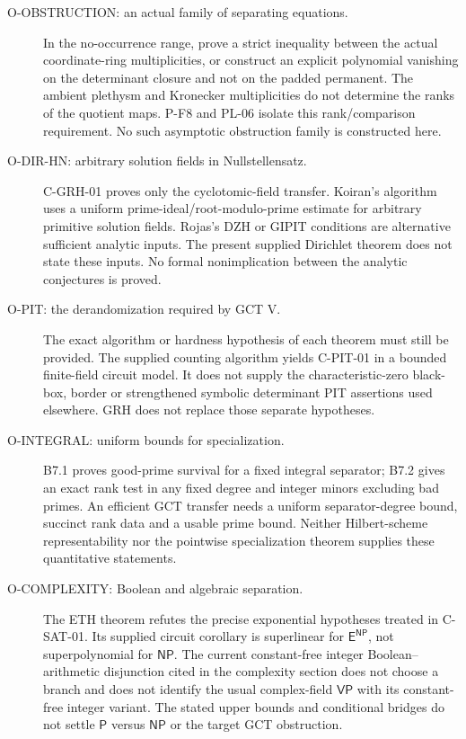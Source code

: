 \begin{description}
\item[O-OBSTRUCTION: an actual family of separating equations.]
In the no-occurrence range, prove a strict inequality between the actual
coordinate-ring multiplicities, or construct an explicit polynomial
vanishing on the determinant closure and not on the padded permanent.
The ambient plethysm and Kronecker multiplicities do not determine the
ranks of the quotient maps. P-F8 and PL-06 isolate this rank/comparison
requirement. No such asymptotic obstruction family is constructed here.

\item[O-DIR-HN: arbitrary solution fields in Nullstellensatz.]
C-GRH-01 proves only the cyclotomic-field transfer. Koiran's algorithm uses
a uniform prime-ideal/root-modulo-prime estimate for arbitrary primitive
solution fields. Rojas's DZH or GIPIT conditions are alternative sufficient
analytic inputs. The present supplied Dirichlet theorem does not state
these inputs. No formal nonimplication between the analytic conjectures
is proved.

\item[O-PIT: the derandomization required by GCT V.]
The exact algorithm or hardness hypothesis of each theorem must still be
provided. The supplied counting algorithm yields C-PIT-01 in a bounded
finite-field circuit model. It does not supply the characteristic-zero
black-box, border or strengthened symbolic determinant PIT assertions
used elsewhere. GRH does not replace those separate hypotheses.

\item[O-INTEGRAL: uniform bounds for specialization.]
B7.1 proves good-prime survival for a fixed integral separator; B7.2 gives
an exact rank test in any fixed degree and integer minors excluding bad
primes. An efficient GCT transfer needs a uniform separator-degree bound,
succinct rank data and a usable prime bound. Neither Hilbert-scheme
representability nor the pointwise specialization theorem supplies these
quantitative statements.

\item[O-COMPLEXITY: Boolean and algebraic separation.]
The ETH theorem refutes the precise exponential hypotheses treated in
C-SAT-01. Its supplied circuit corollary is superlinear for
$\mathsf E^{\mathsf{NP}}$, not superpolynomial for $\mathsf{NP}$.
The current constant-free integer Boolean--arithmetic disjunction cited
in the complexity section does not choose a branch and does not identify
the usual complex-field $\mathsf{VP}$ with its constant-free integer
variant. The stated upper bounds and conditional bridges do not settle
$\mathsf P$ versus $\mathsf{NP}$ or the target GCT obstruction.
\end{description}

